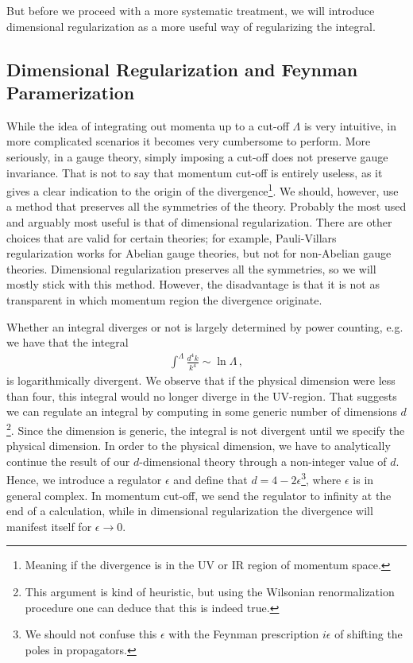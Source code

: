 But before we proceed with a more systematic treatment, we will introduce dimensional regularization as a more useful way of regularizing the integral.


\subsection{Dimensional Regularization and Feynman Paramerization}\label{sec:dimensional regularization}
While the idea of integrating out momenta up to a cut-off $\Lambda$ is very intuitive, in more complicated scenarios it becomes very cumbersome to perform. More seriously, in a gauge theory, simply imposing a cut-off does not preserve gauge invariance. That is not to say that momentum cut-off is entirely useless, as it gives a clear indication to the origin of the divergence\footnote{Meaning if the divergence is in the UV or IR region of momentum space.}.
We should, however, use a method that preserves all the symmetries of the theory. Probably the most used and arguably most useful is that of dimensional regularization. There are other choices that are valid for certain theories; for example, Pauli-Villars regularization works for Abelian gauge theories, but not for non-Abelian gauge theories. Dimensional regularization preserves all the symmetries, so we will mostly stick with this method. However, the disadvantage is that it is not as transparent in which momentum region the divergence originate.

Whether an integral diverges or not is largely determined by power counting, e.g. we have that the integral
\begin{align}
    \int^{\Lambda}\frac{d^{4}k}{k^{4}}\sim\ln\Lambda\,,
\end{align}
is logarithmically divergent. We observe that if the physical dimension were less than four, this integral would no longer diverge in the UV-region. That suggests we can regulate an integral by computing in some generic number of dimensions $d$\footnote{This argument is kind of heuristic, but using the Wilsonian renormalization procedure one can deduce that this is indeed true.}. Since the dimension is generic, the integral is not divergent until we specify the physical dimension. In order to  the physical dimension, we have to analytically continue the result of our $d$-dimensional theory through a non-integer value of $d$. Hence, we introduce a regulator $\epsilon$ and define that $d=4-2\epsilon$\footnote{We should not confuse this $\epsilon$ with the Feynman prescription $i\epsilon$ of shifting the poles in propagators.}, where $\epsilon$ is in general complex. In momentum cut-off, we send the regulator to infinity at the end of a calculation, while in dimensional regularization the divergence will manifest itself for $\epsilon\rightarrow 0$.


